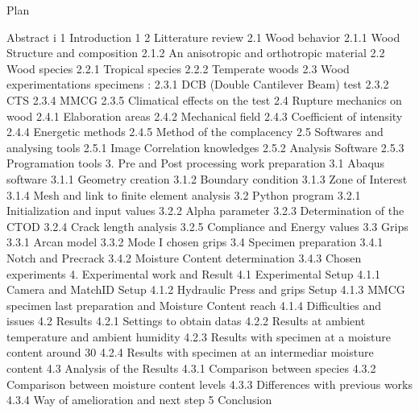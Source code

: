 Plan 

Abstract i
1 Introduction 1
2 Litterature review
2.1 Wood behavior 
2.1.1 Wood Structure and composition 
2.1.2 An anisotropic and orthotropic material 
2.2 Wood species
2.2.1 Tropical species
2.2.2 Temperate woods
2.3 Wood experimentations specimens : 
2.3.1 DCB (Double Cantilever Beam) test
2.3.2 CTS
2.3.4 MMCG	 
2.3.5 Climatical effects on the test 
2.4 Rupture mechanics on wood
2.4.1 Elaboration areas
2.4.2 Mechanical field
2.4.3 Coefficient of intensity  
2.4.4 Energetic methods
2.4.5 Method of the complacency
2.5 Softwares and analysing tools 
2.5.1 Image Correlation knowledges
2.5.2 Analysis Software
2.5.3 Programation tools
3. Pre and Post processing work preparation
3.1 Abaqus software
3.1.1 Geometry creation
3.1.2 Boundary condition
3.1.3 Zone of Interest 
3.1.4 Mesh and link to finite element analysis
3.2 Python program
3.2.1 Initialization and input values
3.2.2 Alpha parameter
3.2.3 Determination of the CTOD
3.2.4 Crack length analysis
3.2.5 Compliance and Energy values
3.3 Grips
3.3.1 Arcan model
3.3.2 Mode I chosen grips
3.4 Specimen preparation
3.4.1 Notch and Precrack
3.4.2 Moisture Content determination
3.4.3 Chosen experiments
4. Experimental work and Result
4.1 Experimental Setup
4.1.1 Camera and MatchID Setup
4.1.2 Hydraulic Press and grips Setup
4.1.3 MMCG specimen last preparation and Moisture Content reach
4.1.4 Difficulties and issues
4.2 Results
4.2.1 Settings to obtain datas
4.2.2 Results at ambient temperature and ambient humidity
4.2.3 Results with specimen at a moisture content around 30%
4.2.4 Results with specimen at an intermediar moisture content
4.3 Analysis of the Results
4.3.1 Comparison between species
4.3.2 Comparison between moisture content levels
4.3.3 Differences with previous works
4.3.4 Way of amelioration and next step
5 Conclusion


